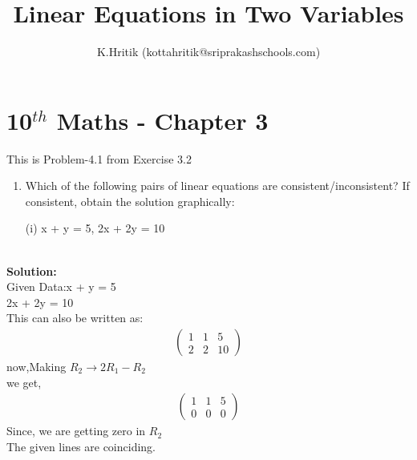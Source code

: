 \documentclass[12pt]{article}
\title{Linear Equations in Two Variables}
\author{K.Hritik (kottahritik@sriprakashschools.com)}
\newcommand{\myvec}[1]{\ensuremath{\begin{pmatrix}#1\end{pmatrix}}}
\newcommand{\solution}{\noindent \textbf{Solution: }}
\begin{document}
\maketitle
\section*{10$^{th}$ Maths - Chapter 3}
This is Problem-4.1 from Exercise 3.2
\begin{enumerate}
\item  Which of the following pairs of linear equations are consistent/inconsistent? If consistent, obtain the solution graphically:

(i) x + y = 5, 2x + 2y = 10 \\\\
\end{enumerate}
\solution \\
Given Data:x + y = 5\\ 
           2x + 2y = 10\\

This can also be written as:
\begin{align}
\myvec{1&1&5\\2&2&10}
\end{align}
now,Making $R_2 \xrightarrow\ 2R_1 - R_2$\\ 
we get,
\begin{align}
\myvec{1&1&5\\0&0&0}
\end{align}
Since, we are getting zero in $R_2$\\
The given lines are coinciding.
\end{document}
